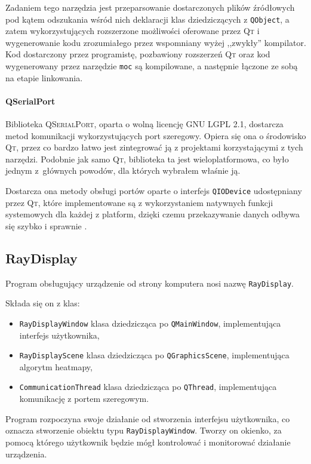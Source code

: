 Zadaniem tego narzędzia jest przeparsowanie dostarczonych plików źródłowych pod kątem odszukania wśród nich deklaracji klas dziedziczących z \verb|QObject|, a zatem wykorzystujących rozszerzone możliwości oferowane przez \textsc{Qt} i wygenerowanie kodu zrozumiałego przez wspomniany wyżej ,,zwykły'' kompilator.
Kod dostarczony przez programistę, pozbawiony rozszerzeń \textsc{Qt} oraz kod wygenerowany przez narzędzie \texttt{moc} są kompilowane, a następnie łączone ze sobą na etapie linkowania.

\paragraph{QSerialPort}
Biblioteka \textsc{QSerialPort}, oparta o wolną licencję \textsc{GNU LGPL 2.1}, dostarcza metod komunikacji wykorzystujących port szeregowy.
Opiera się ona o środowisko \textsc{Qt}, przez co bardzo łatwo jest zintegrować ją z projektami korzystającymi z tych narzędzi.
Podobnie jak samo \textsc{Qt}, biblioteka ta jest wieloplatformowa, co było jednym z~głównych powodów, dla których wybrałem właśnie ją.

Dostarcza ona metody obsługi portów oparte o interfejs \verb|QIODevice| udostępniany przez \textsc{Qt}, które implementowane są z wykorzystaniem natywnych funkcji systemowych dla każdej z platform, dzięki czemu przekazywanie danych odbywa się szybko i sprawnie \citep{QSP}.

\subsection{RayDisplay}\label{sec:raydisplay}

Program obsługujący urządzenie od strony komputera nosi nazwę \texttt{RayDisplay}.

Składa się on z klas:
\begin{itemize}
 \item \verb|RayDisplayWindow| \pauza klasa dziedzicząca po \verb|QMainWindow|, implementująca interfejs użytkownika,
 \item \verb|RayDisplayScene| \pauza klasa dziedzicząca po \verb|QGraphicsScene|, implementująca algorytm heatmapy,
 \item \verb|CommunicationThread| \pauza klasa dziedzicząca po \verb|QThread|, implementująca komunikację z portem szeregowym.\\
\end{itemize}

Program rozpoczyna swoje działanie od stworzenia interfejsu użytkownika, co oznacza stworzenie obiektu typu \verb|RayDisplayWindow|.
Tworzy on okienko, za pomocą którego użytkownik będzie mógł kontrolować i monitorować działanie urządzenia.

